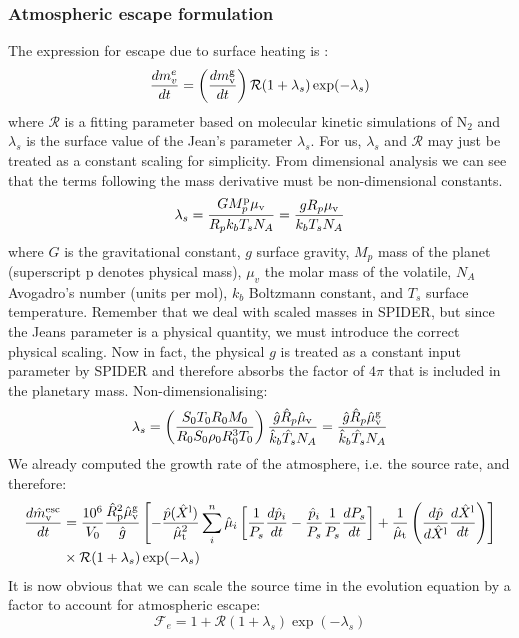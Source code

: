 \subsubsection{Atmospheric escape formulation}
The expression for escape due to surface heating is \citep{JOY15}: %
\begin{equation}
\frac{d m_v^e}{dt} = \left( \frac{d m_{\rm v}^{\rm g}}{dt} \right) \mathcal{R} (1 + \lambda_s) \exp(-\lambda_s) 
\end{equation}
where $\mathcal{R}$ is a fitting parameter based on molecular kinetic simulations of N$_2$ \citep{VJT11,VTE11} and $\lambda_s$ is the surface value of the Jean's parameter $\lambda_s$.  For us, $\lambda_s$ and $\mathcal{R}$ may just be treated as a constant scaling for simplicity.  From dimensional analysis we can see that the terms following the mass derivative must be non-dimensional constants.
\begin{equation}
\lambda_s =  \frac{G M_p^{\rm p} \mu_{\rm v}}{R_p k_b T_s N_A} = \frac{g R_p \mu_{\rm v}}{k_b T_s N_A}
\end{equation}
where $G$ is the gravitational constant, $g$ surface gravity, $M_p$ mass of the planet (superscript p denotes physical mass), $\mu_v$ the molar mass of the volatile, $N_A$ Avogadro's number (units per mol), $k_b$ Boltzmann constant, and $T_s$ surface temperature.  Remember that we deal with scaled masses in SPIDER, but since the Jeans parameter is a physical quantity, we must introduce the correct physical scaling.  Now in fact, the physical $g$ is treated as a constant input parameter by SPIDER and therefore absorbs the factor of $4 \pi$ that is included in the planetary mass.  Non-dimensionalising:
\begin{equation}
\lambda_s = \left( \frac{S_0 T_0 R_0 M_0}{R_0 S_0 \rho_0 R_0^3 T_0} \right) \frac{\hat{g} \hat{R}_p \hat{\mu}_{\rm v}}{\hat{k}_b \hat{T}_s N_A} = \frac{\hat{g} \hat{R}_p \hat{\mu}_{\rm v}^{\rm g}}{\hat{k}_b \hat{T}_s N_A}
\end{equation}
We already computed the growth rate of the atmosphere, i.e. the source rate, and therefore:
\begin{align}
\frac{d \hat{m}_{\rm v}^{\rm esc}}{dt} &= \frac{10^6}{V_0} \frac{\hat{R}_{\rm p}^2 \hat{\mu}_{\rm v}^{\rm g}}{\hat{g}}
\left[
-\frac{\hat{p}(\hat{X}^{\rm l})}{\hat{\mu}_{\rm t}^2} \sum_i^n \hat{\mu}_i \left[ \frac{1}{P_s} \frac{d \hat{p}_i}{d t} - \frac{\hat{p}_i}{P_s} \frac{1}{P_s} \frac{d P_s}{d t} \right] + \frac{1}{\hat{\mu}_{\rm t}} \left( \frac{d \hat{p}}{d \hat{X}^{\rm l}} \frac{d \hat{X}^{\rm l}}{d t} \right)
\right]\\
& \times \mathcal{R} (1 + \lambda_s) \exp(-\lambda_s) 
\end{align}
It is now obvious that we can scale the source time in the evolution equation by a factor to account for atmospheric escape:
\begin{equation}
\mathcal{F}_e = 1+\mathcal{R} (1 + \lambda_s) \exp(-\lambda_s)
\end{equation}
